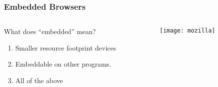 \documentclass[
	notes=none,
	aspectratio=169
]{beamer}
\begin{document}
\begin{frame}
\frametitle{Embedded Browsers}

\begin{columns}[T]
\begin{column}[T]{0.5\textwidth}
\setlength{\parskip}{0.5em}

\vspace{1.5cm}
What does ``embedded'' mean?
\begin{enumerate}
\setlength{\parskip}{0.5em}
\item Smaller resource footprint devices
\item Embeddable on other programs.
\item All of the above
\end{enumerate}

\end{column}
\begin{column}[T]{0.5\textwidth}
\setlength{\parskip}{0.5em}

\vspace{0.5cm}
\texttt{[image: mozilla]}

\end{column}
\end{columns}

\end{frame}
\note{
\begin{enumerate}
\item -
\end{enumerate}
}

\end{document}
